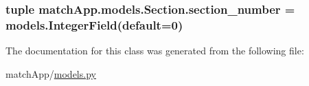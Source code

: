 \subsubsection[{section\+\_\+number}]{\setlength{\rightskip}{0pt plus 5cm}tuple match\+App.\+models.\+Section.\+section\+\_\+number = models.\+Integer\+Field(default=0)\hspace{0.3cm}{\ttfamily [static]}}\label{classmatch_app_1_1models_1_1_section_ae71939f61c0134b1bc0e02eab1b517d3}


The documentation for this class was generated from the following file\+:\begin{DoxyCompactItemize}
\item 
match\+App/\hyperlink{models_8py}{models.\+py}\end{DoxyCompactItemize}
